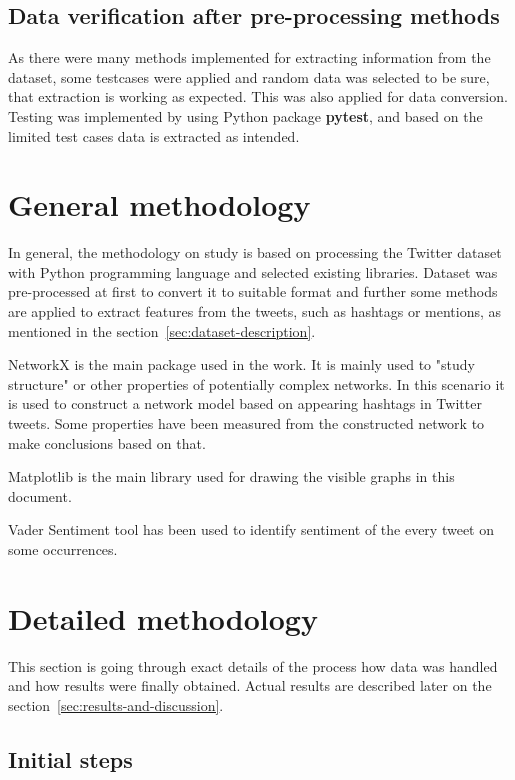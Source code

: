 \documentclass[conference]{IEEEtran}
\begin{document}
\subsection{Data verification after pre-processing methods}


As there were many methods implemented for extracting information from the dataset, some testcases were applied
and random data was selected to be sure, that extraction is working as expected.
This was also applied for data conversion.
Testing was implemented by using Python package \textbf{pytest}\cite{pytestx.y}, and based on the limited test cases data is extracted as intended.

\section{General methodology}\label{sec:general-methodology}

In general, the methodology on study is based on processing the Twitter dataset with Python programming language and selected existing libraries.
Dataset was pre-processed at first to convert it to suitable format and further some methods are applied to extract
features from the tweets, such as hashtags or mentions, as mentioned in the section~\ref{sec:dataset-description}.


NetworkX\cite{SciPyProceedings_11} is the main package used in the work.
It is mainly used to "study structure" or other properties of potentially complex networks.
In this scenario it is used to construct a network model based on appearing hashtags in Twitter tweets.
Some properties have been measured from the constructed network to make conclusions based on that.

Matplotlib\cite{4160265} is the main library used for drawing the visible graphs in this document.

Vader Sentiment\cite{Hutto_Gilbert_2014} tool has been used to identify sentiment of the every tweet on some occurrences.

\section{Detailed methodology}\label{sec:detailed-methodology}

This section is going through exact details of the process how data was handled and how results were finally obtained.
Actual results are described later on the section~\ref{sec:results-and-discussion}.


\subsection{Initial steps}
\end{document}
